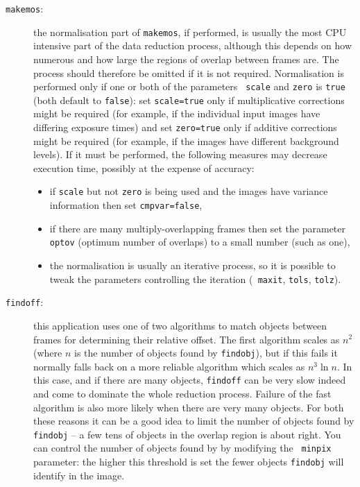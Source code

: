 \documentclass[twoside,11pt]{article}
\begin{document}
\begin{description}
  \item[{\tt makemos}:] the normalisation part of {\tt makemos}, if performed,
   is usually the most CPU intensive part of the data reduction process,
   although this depends on how numerous and how large the regions of overlap
   between frames are.
   The process should therefore be omitted if it is not required.
   Normalisation is performed only if one or both of the parameters {\tt
   scale} and {\tt zero} is {\tt true} (both default to {\tt false}):
   set {\tt scale=true} only if multiplicative corrections might be required
   (for example, if the individual input images have differing exposure times)
   and set {\tt zero=true} only if additive corrections might be required
   (for example, if the images have different background levels).
   If it must be performed, the following measures may decrease execution
   time, possibly at the expense of accuracy:

  \begin{itemize}

    \item if {\tt scale} but not {\tt zero} is being used and the images
     have variance information then set {\tt cmpvar=false},

    \item if there are many multiply-overlapping frames then set the
     parameter {\tt optov} (optimum number of overlaps) to a small number
     (such as one),

    \item the normalisation is usually an iterative process, so it is
     possible to tweak the parameters controlling the iteration ({\tt
     maxit}, {\tt tols}, {\tt tolz}).

  \end{itemize}

  \item[{\tt findoff}:] this application uses one of two algorithms to match
   objects between frames for determining their relative offset.
   The first algorithm scales as $n^2$ (where $n$ is the number of objects
   found by {\tt findobj}), but if this fails it normally falls back on a
   more reliable algorithm which scales as $n^3 \ln n$.
   In this case, and if there are many objects, {\tt findoff} can be very
   slow indeed and come to dominate the whole reduction process.
   Failure of the fast algorithm is also more likely when there are
   very many objects.
   For both these reasons it can be a good idea to limit the number of
   objects found by {\tt findobj} -- a few tens of objects in the overlap
   region is about right.
   You can control the number of objects found by by modifying the {\tt
   minpix} parameter: the higher this threshold is set the fewer
   objects {\tt findobj} will identify in the image.

\end{description}
\end{document}
